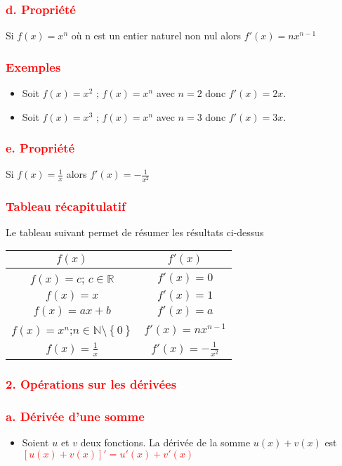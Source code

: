 \documentclass[12pt]{article}
\begin{document}
\subsubsection*{\textcolor{red}{d. Propriété}}
Si $f(x)=x^{n}$ où n est un entier naturel non nul alors $f'(x)=nx^{n-1}$
\subsubsection*{\textcolor{red}{Exemples}}
\begin{itemize}
\item Soit $f(x) = x^{2}$ ; $f(x) = x^{n}$ avec $n=2$ donc $f'(x) = 2x$.
\item Soit $f(x) = x^{3}$ ; $f(x) = x^{n}$ avec $n=3$ donc $f'(x) = 3x$.
\end{itemize}
\subsubsection*{\textcolor{red}{e. Propriété}}
Si $f(x)=\frac{1}{x}$ alors $f'(x)=-\frac{1}{x^{2}}$
\subsubsection*{\textcolor{red}{Tableau récapitulatif}}
Le tableau suivant permet de résumer les résultats ci-dessus\\
\begin{tabular}{|c|c|}
\hline
$f(x)$ & $f'(x)$ \\
\hline
$f(x)=c$; $c\in \mathbb{R}$ & $f'(x)=0$ \\
\hline
$f(x)=x$ & $f'(x)=1$\\
\hline
$f(x)=ax+b$ & $f'(x)=a$\\
\hline
$f(x)=x^{n}$;$n \in \mathbb{N}\setminus\left\lbrace 0\right\rbrace $ & $f'(x)=nx^{n-1}$\\
\hline
$f(x)=\frac{1}{x}$ & $f'(x)=-\frac{1}{x^{2}}$\\
\hline
\end{tabular}
\subsubsection*{\textcolor{red}{2. Opérations sur les dérivées}}
\subsubsection*{\textcolor{red}{a. Dérivée d’une somme}}
\begin{itemize}
\item Soient $u$ et $v$ deux fonctions. La dérivée de la somme $u(x) + v(x)$ est\\
\textcolor{red}{$[u(x) + v(x)]'=u'(x) + v'(x)$}
\end{itemize}
\end{document}
